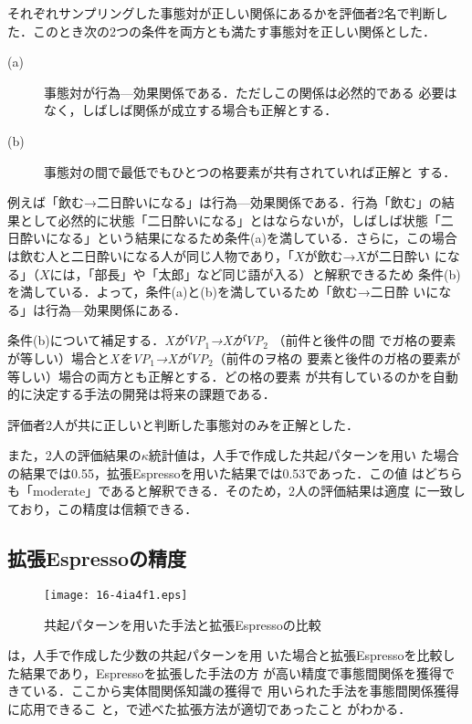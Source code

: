 \documentclass[japanese]{jnlp_1.4}
\begin{document}
それぞれサンプリングした事態対が正しい関係にあるかを評価者2名で判断し
た．このとき次の2つの条件を両方とも満たす事態対を正しい関係とした．
\begin{description}
\item [(a)] 事態対が行為—効果関係である．ただしこの関係は必然的である
  必要はなく，しばしば関係が成立する場合も正解とする．
\item [(b)] 事態対の間で最低でもひとつの格要素が共有されていれば正解と
  する．
\end{description}
例えば「飲む→二日酔いになる」は行為—効果関係である．行為「飲む」の結
果として必然的に状態「二日酔いになる」とはならないが，しばしば状態「二
日酔いになる」という結果になるため条件(a)を満している．さらに，この場合
は飲む人と二日酔いになる人が同じ人物であり，「$X$が飲む→$X$が二日酔い
になる」（$X$には，「部長」や「太郎」など同じ語が入る）と解釈できるため
条件(b)を満している．よって，条件(a)と(b)を満しているため「飲む→二日酔
いになる」は行為—効果関係にある．

条件(b)について補足する．\textit{XがVP$_1$→XがVP$_2$} （前件と後件の間
でガ格の要素が等しい）場合と\textit{XをVP$_1$→XがVP$_2$}（前件のヲ格の
要素と後件のガ格の要素が等しい）場合の両方とも正解とする．どの格の要素
が共有しているのかを自動的に決定する手法の開発は将来の課題である．

評価者2人が共に正しいと判断した事態対のみを正解とした．

また，2人の評価結果の$\kappa$統計値は，人手で作成した共起パターンを用い
た場合の結果では0.55，拡張Espressoを用いた結果では0.53であった．この値
はどちらも「moderate」であると解釈できる．そのため，2人の評価結果は適度
に一致しており，この精度は信頼できる．


\subsection{拡張Espressoの精度}
\label{ssec:experiment_main}

\begin{figure}[t]
\begin{center}
  \texttt{[image: 16-4ia4f1.eps]}
\end{center}
  \caption{共起パターンを用いた手法と拡張Espressoの比較}
  \label{fig:baseline_vs_bootstrapping}
\end{figure}

は，人手で作成した少数の共起パターンを用
いた場合と拡張Espressoを比較した結果であり，Espressoを拡張した手法の方
が高い精度で事態間関係を獲得できている．ここから実体間関係知識の獲得で
用いられた手法を事態間関係獲得に応用できるこ
と，で述べた拡張方法が適切であったこと
がわかる．
\end{document}
